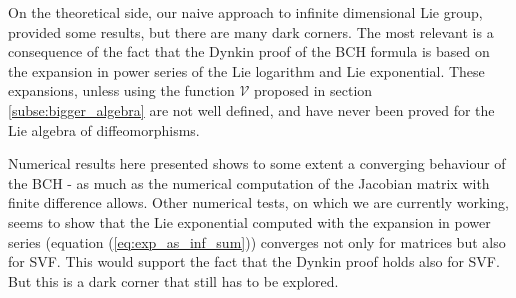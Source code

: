 On the theoretical side, our naive approach to infinite dimensional Lie group, provided some results, but there are many dark corners. The most relevant is a consequence of the fact that the Dynkin proof of the BCH formula is based on the expansion in power series of the Lie logarithm and Lie exponential. These expansions, unless using the function $\mathcal{V}$ proposed in section \ref{subse:bigger_algebra} are not well defined, and have never been proved for the Lie algebra of diffeomorphisms.

Numerical results here presented shows to some extent a converging behaviour of the BCH - as much as the numerical computation of the Jacobian matrix with finite difference allows.
Other numerical tests, on which we are currently working, seems to show that the Lie exponential computed with the expansion in power series (equation (\ref{eq:exp_as_inf_sum})) converges not only for matrices but also for SVF. This would support the fact that the Dynkin proof holds also for SVF. But this is a dark corner that still has to be explored.

